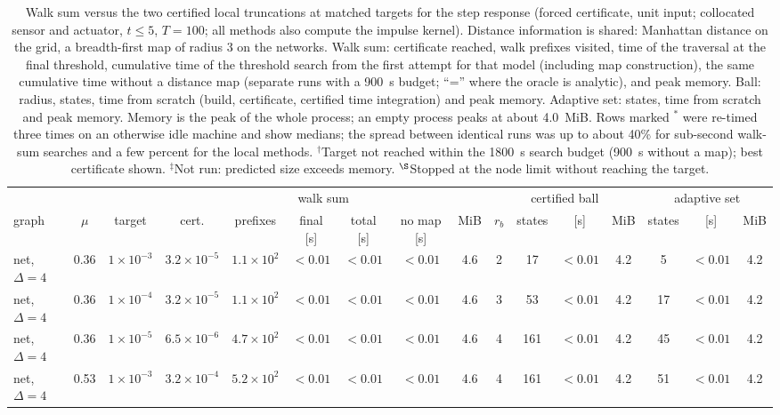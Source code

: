 \documentclass[aps,pra,superscriptaddress,floatfix,longbibliography,twocolumn]{revtex4-2}
\begin{document}
\begin{table}[t]
\footnotesize\setlength{\tabcolsep}{1.25pt}
\caption{Walk sum versus the two certified local truncations at matched targets for the step response (forced certificate, unit input; collocated sensor and actuator, $t\le5$, $T=100$; all methods also compute the impulse kernel). Distance information is shared: Manhattan distance on the grid, a breadth-first map of radius 3 on the networks. Walk sum: certificate reached, walk prefixes visited, time of the traversal at the final threshold, cumulative time of the threshold search from the first attempt for that model (including map construction), the same cumulative time without a distance map (separate runs with a 900~s budget; ``='' where the oracle is analytic), and peak memory. Ball: radius, states, time from scratch (build, certificate, certified time integration) and peak memory. Adaptive set: states, time from scratch and peak memory. Memory is the peak of the whole process; an empty process peaks at about 4.0~MiB. Rows marked $^*$ were re-timed three times on an otherwise idle machine and show medians; the spread between identical runs was up to about 40\% for sub-second walk-sum searches and a few percent for the local methods. $^\dagger$Target not reached within the 1800~s search budget (900~s without a map); best certificate shown. $^\ddagger$Not run: predicted size exceeds memory. $^\S$Stopped at the node limit without reaching the target.}\label{tab:crossover}
\begin{ruledtabular}
\begin{tabular}{lcc|cccccc|cccc|ccc}
 & & & \multicolumn{6}{c|}{walk sum} & \multicolumn{4}{c|}{certified ball} & \multicolumn{3}{c}{adaptive set}\\
graph & $\mu$ & target & cert. & prefixes & final [s] & total [s] & no map [s] & MiB & $r_b$ & states & [s] & MiB & states & [s] & MiB\\\hline
net, $\Delta=4$ & 0.36 & $1\times10^{-3}$ & $3.2\times10^{-5}$ & $1.1\times10^{2}$ & $<0.01$ & $<0.01$ & $<0.01$ & 4.6 & 2 & 17 & $<0.01$ & 4.2 & 5 & $<0.01$ & 4.2 \\
net, $\Delta=4$ & 0.36 & $1\times10^{-4}$ & $3.2\times10^{-5}$ & $1.1\times10^{2}$ & $<0.01$ & $<0.01$ & $<0.01$ & 4.6 & 3 & 53 & $<0.01$ & 4.2 & 17 & $<0.01$ & 4.2 \\
net, $\Delta=4$ & 0.36 & $1\times10^{-5}$ & $6.5\times10^{-6}$ & $4.7\times10^{2}$ & $<0.01$ & $<0.01$ & $<0.01$ & 4.6 & 4 & 161 & $<0.01$ & 4.2 & 45 & $<0.01$ & 4.2 \\
net, $\Delta=4$ & 0.53 & $1\times10^{-3}$ & $3.2\times10^{-4}$ & $5.2\times10^{2}$ & $<0.01$ & $<0.01$ & $<0.01$ & 4.6 & 4 & 161 & $<0.01$ & 4.2 & 51 & $<0.01$ & 4.2 \\

\end{tabular}
\end{ruledtabular}
\end{table}
\end{document}
